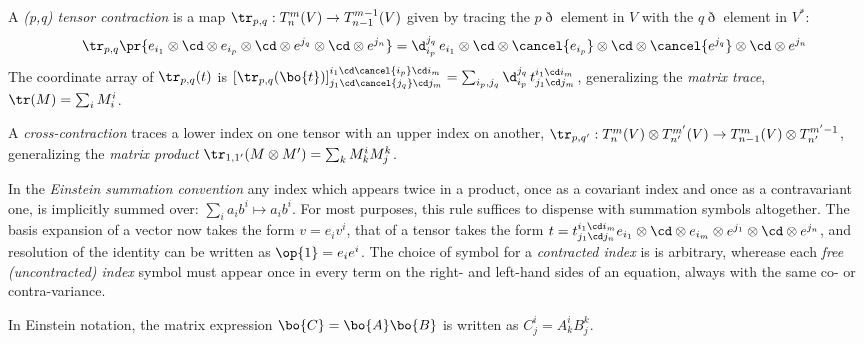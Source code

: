 \documentclass[11pt,fleqn]{article}
\numberwithin{equation}{section}
\begin{document}
\begin{dfn}
A \textit{(p,q) tensor contraction} is a map $\tr_{p,q}:T_n^m(V)\rightarrow T_{n-1}^{m-1}(V)$ given by tracing the $p\eth$ element in $V$ with the $q\eth$ element in $V^*$:
\begin{align}
&&
  \tr_{p,q}\pr{
    e_{i_1}\otimes\cd\otimes e_{i_p}\otimes\cd\otimes e^{j_q}\otimes\cd\otimes e^{j_n}
  }
=
  \d_{i_p}^{j_q}\,
  e_{i_1}\otimes\cd\otimes \cancel{e_{i_p}}\otimes\cd\otimes 
  \cancel{e^{j_q}}\otimes\cd\otimes e^{j_n}
\end{align}
The coordinate array of $\tr_{p,q}(t)$ is $[\tr_{p,q}(\bo{t})]^{i_1\cd \cancel{i_p}\cd i_m}_{j_1\cd \cancel{j_q}\cd j_m}=\sum_{i_p,j_q}\d_{i_p}^{j_q}\,t^{i_1\cd i_m}_{j_1\cd j_m}$, generalizing the \textit{matrix trace}, $\tr(M)=\sum_i M_i^i$.
\end{dfn}

\begin{dfn}
A \textit{cross-contraction} traces a lower index on one tensor with an upper index on another, $\tr_{p,q'}:T_n^m(V)\otimes T_{n'}^{m'}(V)\rightarrow T^{m}_{n-1}(V)\otimes T^{m'-1}_{n'}$, generalizing the \textit{matrix product} $\tr_{1,1'}(M\otimes M')=\sum_k M^i_kM^k_j$.
\end{dfn}

\begin{ntt}
In the \textit{Einstein summation convention} any index which appears twice in a product, once as a covariant index and once as a contravariant one, is implicitly summed over: $\sum_i a_i b^i\mapsto a_ib^i$.
For most purposes, this rule suffices to dispense with summation symbols altogether.
The basis expansion of a vector now takes the form $v=e_iv^i$, that of a tensor takes the form $t = t_{j_1\cd j_n}^{i_1\cd i_m}e_{i_1}\otimes\cd\otimes e_{i_m}\otimes e^{j_1}\otimes\cd\otimes e^{j_n}$, and resolution of the identity can be written as $\op{1}=e_ie^i$.
The choice of symbol for a \textit{contracted index} is is arbitrary, wherease each \textit{free \emph{(uncontracted)} index} symbol must appear once in every term on the right- and left-hand sides of an equation, always with the same co- or contra-variance.
\end{ntt}

\begin{ex}
In Einstein notation, the matrix expression $\bo{C}=\bo{A}\bo{B}$ is written as $C^i_j=A^i_kB^k_j$.
\end{ex}
\end{document}
